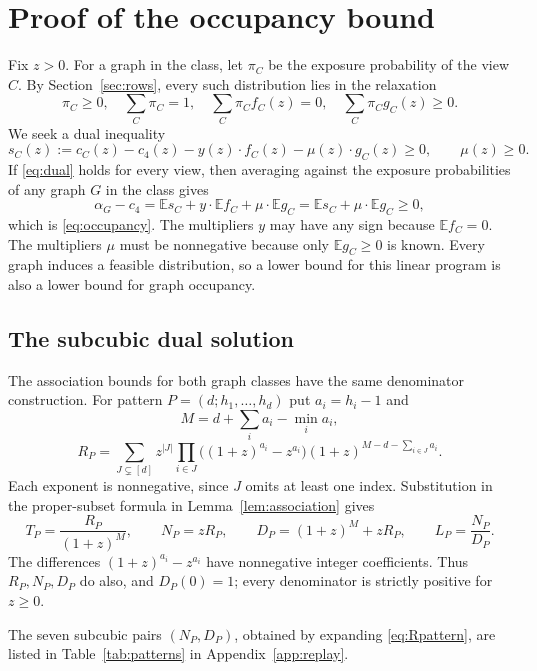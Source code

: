\documentclass[11pt]{article}
\newcommand{\E}{\mathbb E}\newcommand{\Prob}{\mathbb P}
\begin{document}
\section{Proof of the occupancy bound}\label{sec:certificate}
Fix $z>0$. For a graph in the class, let $\pi_C$ be the exposure probability of the view $C$. By Section~\ref{sec:rows}, every such distribution lies in the relaxation
\[
 \pi_C\ge0,\quad\sum_C\pi_C=1,\quad
 \sum_C\pi_C f_C(z)=0,\quad\sum_C\pi_C g_C(z)\ge0.
\]
We seek a dual inequality
\begin{equation}\label{eq:dual}
 s_C(z):=c_C(z)-c_4(z)-y(z)\cdot f_C(z)-\mu(z)\cdot g_C(z)\ge0,
 \qquad \mu(z)\ge0.
\end{equation}
If \eqref{eq:dual} holds for every view, then averaging against the exposure probabilities of any graph $G$ in the class gives
\[
 \alpha_G-c_4=\E s_C+y\cdot\E f_C+\mu\cdot\E g_C=\E s_C+\mu\cdot\E g_C\ge0,
\]
which is \eqref{eq:occupancy}. The multipliers $y$ may have any sign because $\E f_C=0$. The multipliers $\mu$ must be nonnegative because only $\E g_C\ge0$ is known. Every graph induces a feasible distribution, so a lower bound for this linear program is also a lower bound for graph occupancy.

\subsection{The subcubic dual solution}
The association bounds for both graph classes have the same denominator construction. For pattern $P=(d;h_1,\ldots,h_d)$ put $a_i=h_i-1$ and
\[
 M=d+\sum_i a_i-\min_i a_i,
\]
\begin{equation}\label{eq:Rpattern}
 R_P=\sum_{J\subsetneq[d]}z^{|J|}
       \prod_{i\in J}\bigl((1+z)^{a_i}-z^{a_i}\bigr)
       (1+z)^{M-d-\sum_{i\in J}a_i}.
\end{equation}
Each exponent is nonnegative, since $J$ omits at least one index. Substitution in the proper-subset formula in Lemma~\ref{lem:association} gives
\[
 T_P=\frac{R_P}{(1+z)^M},\qquad N_P=zR_P,\qquad
 D_P=(1+z)^M+zR_P,\qquad L_P=\frac{N_P}{D_P}.
\]
The differences $(1+z)^{a_i}-z^{a_i}$ have nonnegative integer coefficients. Thus $R_P,N_P,D_P$ do also, and $D_P(0)=1$; every denominator is strictly positive for $z\ge0$. 

The seven subcubic pairs $(N_P,D_P)$, obtained by expanding \eqref{eq:Rpattern}, are listed in Table~\ref{tab:patterns} in Appendix~\ref{app:replay}.
\end{document}
